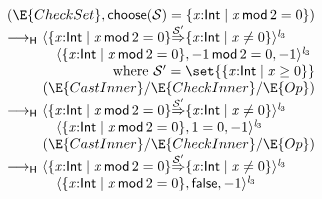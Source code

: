 \documentclass[9pt]{extarticle}
\newcommand{\ottnt}[1]{\mathit{#1}}
\newcommand{\ottsym}[1]{#1}
\begin{document}
{\begin{figure}[t]
\[\begin{array}{r@{~}l}
 \multicolumn{2}{r}{(\E{CheckSet},  \mathsf{choose} ( \mathcal{S} )   \ottsym{=}   \{ \mathit{x} \mathord{:}  \mathsf{Int}  \mathrel{\mid}  \mathit{x} \,  \mathsf{mod}  \, \ottsym{2}  \mathrel{=}  \ottsym{0}  \} )} \\
  \longrightarrow _{  \mathsf{H}  }  &  \langle   \{ \mathit{x} \mathord{:}  \mathsf{Int}  \mathrel{\mid}  \mathit{x} \,  \mathsf{mod}  \, \ottsym{2}  \mathrel{=}  \ottsym{0}  \}   \mathord{ \overset{ \mathcal{S}' }{\Rightarrow} }   \{ \mathit{x} \mathord{:}  \mathsf{Int}  \mathrel{\mid}  \mathit{x}  \mathrel{\ne}  \ottsym{0}  \}   \rangle^{ \ottnt{l_{{\mathrm{3}}}} } ~  {} \\  &  \quad   \langle   \{ \mathit{x} \mathord{:}  \mathsf{Int}  \mathrel{\mid}  \mathit{x} \,  \mathsf{mod}  \, \ottsym{2}  \mathrel{=}  \ottsym{0}  \}  ,    {-1}  \,  \mathsf{mod}  \, \ottsym{2}  \mathrel{=}  \ottsym{0}  ,   {-1}   \rangle^{ \ottnt{l_{{\mathrm{3}}}} }   \\
 \multicolumn{2}{r}{\text{where } \mathcal{S}'  \ottsym{=}   \set{   \{ \mathit{x} \mathord{:}  \mathsf{Int}  \mathrel{\mid}  \mathit{x}  \mathrel{\ge}  \ottsym{0}  \}   } } \\
 \multicolumn{2}{r}{(\E{CastInner}/\E{CheckInner}/\E{Op})} \\
  \longrightarrow _{  \mathsf{H}  }  &  \langle   \{ \mathit{x} \mathord{:}  \mathsf{Int}  \mathrel{\mid}  \mathit{x} \,  \mathsf{mod}  \, \ottsym{2}  \mathrel{=}  \ottsym{0}  \}   \mathord{ \overset{ \mathcal{S}' }{\Rightarrow} }   \{ \mathit{x} \mathord{:}  \mathsf{Int}  \mathrel{\mid}  \mathit{x}  \mathrel{\ne}  \ottsym{0}  \}   \rangle^{ \ottnt{l_{{\mathrm{3}}}} } ~  {} \\  &  \quad   \langle   \{ \mathit{x} \mathord{:}  \mathsf{Int}  \mathrel{\mid}  \mathit{x} \,  \mathsf{mod}  \, \ottsym{2}  \mathrel{=}  \ottsym{0}  \}  ,   \ottsym{1}  \mathrel{=}  \ottsym{0}  ,   {-1}   \rangle^{ \ottnt{l_{{\mathrm{3}}}} }   \\
 \multicolumn{2}{r}{(\E{CastInner}/\E{CheckInner}/\E{Op})} \\
  \longrightarrow _{  \mathsf{H}  }  &  \langle   \{ \mathit{x} \mathord{:}  \mathsf{Int}  \mathrel{\mid}  \mathit{x} \,  \mathsf{mod}  \, \ottsym{2}  \mathrel{=}  \ottsym{0}  \}   \mathord{ \overset{ \mathcal{S}' }{\Rightarrow} }   \{ \mathit{x} \mathord{:}  \mathsf{Int}  \mathrel{\mid}  \mathit{x}  \mathrel{\ne}  \ottsym{0}  \}   \rangle^{ \ottnt{l_{{\mathrm{3}}}} } ~  {} \\  &  \quad   \langle   \{ \mathit{x} \mathord{:}  \mathsf{Int}  \mathrel{\mid}  \mathit{x} \,  \mathsf{mod}  \, \ottsym{2}  \mathrel{=}  \ottsym{0}  \}  ,   \mathsf{false}  ,   {-1}   \rangle^{ \ottnt{l_{{\mathrm{3}}}} }   \\

\end{array}\]
\end{figure}}
\end{document}
